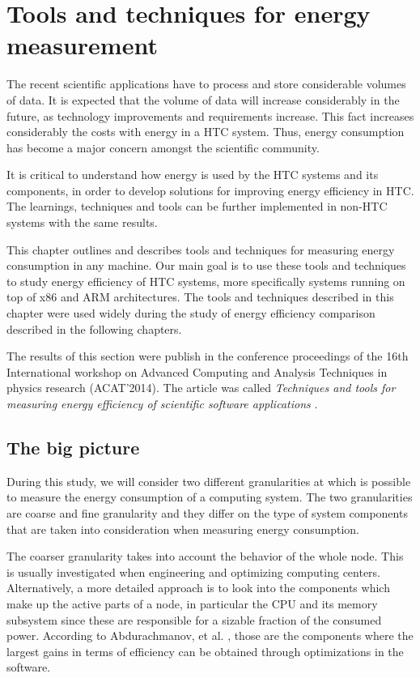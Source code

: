 \chapter{Tools and techniques for energy measurement}


The recent scientific applications have to process and store
considerable volumes of data. It is expected that the volume of
data will increase considerably in the future, as technology improvements and
requirements increase. This fact increases considerably
the costs with energy in a HTC system. Thus, energy consumption has
become a major concern amongst the scientific community.

It is critical to understand how energy is used by the HTC systems and its components, in order to develop solutions for improving energy efficiency in HTC. The learnings, techniques and tools can be further implemented in non-HTC systems with the same results.

This chapter outlines and describes tools and techniques for measuring energy consumption in any machine. Our main goal is to use these tools and techniques to study energy efficiency of HTC systems, more specifically systems running on top of x86 and ARM architectures. The tools and techniques described in this chapter were used widely during the study of energy efficiency comparison described in the following chapters. 


The results of this section were publish in the conference proceedings of the 16th International workshop on Advanced Computing and Analysis Techniques in physics research (ACAT'2014). The article was called \textit{Techniques and tools for measuring energy efficiency of scientific software applications} \cite{ACAT}.

\section{The big picture}

During this study, we will consider two different granularities at which is possible to measure the energy consumption of a computing system. The two granularities are coarse and fine granularity and they differ on the type of system components that are taken into consideration when measuring energy consumption.

The coarser granularity takes into account the behavior of the whole node. This is usually investigated when
engineering and optimizing computing centers. Alternatively, a more detailed approach is to
look into the components which make up the active parts of a
node, in particular the CPU and its memory subsystem since these
are responsible for a sizable fraction of the consumed power.
According to Abdurachmanov, et al. \cite{ACAT}, those are the components where the largest gains in terms of efficiency 
can be obtained through optimizations in the software.

